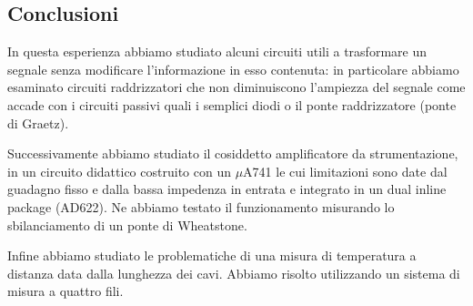 \subsection*{Conclusioni}
In questa esperienza abbiamo studiato alcuni circuiti utili a trasformare un segnale senza modificare l'informazione in esso contenuta: in particolare abbiamo esaminato circuiti raddrizzatori che non diminuiscono l'ampiezza del segnale come accade con i circuiti passivi quali i semplici diodi o il ponte raddrizzatore (ponte di Graetz).

Successivamente abbiamo studiato il cosiddetto amplificatore da strumentazione, in un circuito didattico costruito con un $\mu$A741 le cui limitazioni sono date dal guadagno fisso e dalla bassa impedenza in entrata e integrato in un dual inline package (AD622).
Ne abbiamo testato il funzionamento misurando lo sbilanciamento di un ponte di Wheatstone.

Infine abbiamo studiato le problematiche di una misura di temperatura a distanza data dalla lunghezza dei cavi. Abbiamo risolto utilizzando un sistema di misura a quattro fili.

